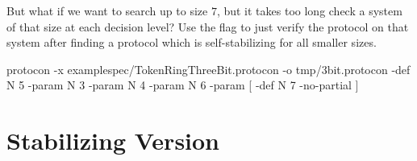 But what if we want to search up to size $7$, but it takes too long check a system of that size at each decision level?
Use the  flag to just verify the protocol on that system after finding a protocol which is self-stabilizing for all smaller sizes.
\begin{code}
protocon -x examplespec/TokenRingThreeBit.protocon -o tmp/3bit.protocon -def N 5 -param N 3 -param N 4 -param N 6 -param [ -def N 7 -no-partial ]
\end{code}

\section{Stabilizing Version}




